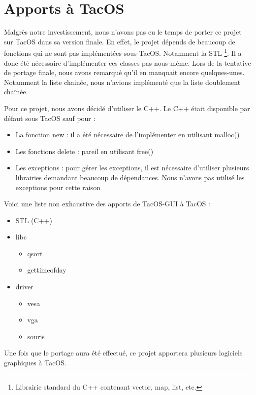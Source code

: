 \section{Apports à TacOS}

Malgrès notre investissement, nous n'avons pas eu le temps de porter ce projet sur TacOS dans sa version finale.
En effet, le projet dépends de beaucoup de fonctions qui ne sont pas implémentées sous TacOS.
Notamment la STL
\footnote{Librairie standard du C++ contenant vector, map, list, etc.}.
Il a donc été nécessaire d'implémenter ces classes pas nous-même.
Lors de la tentative de portage finale, nous avons remarqué qu'il en manquait encore quelques-unes.
Notamment la liste chainée, nous n'avions implémenté que la liste doublement chaînée.

Pour ce projet, nous avons décidé d'utiliser le C++.
Le C++ était disponible par défaut sous TacOS sauf pour :

\begin{itemize}
  \item La fonction new : il a été nécessaire de l'implémenter en utilisant malloc()
  \item Les fonctions delete : pareil en utilisant free()
  \item Les exceptions : pour gérer les exceptions, il est nécessaire d'utiliser plusieurs librairies demandant beaucoup de dépendances. Nous n'avons pas utilisé les exceptions pour cette raison
\end{itemize}

Voici une liste non exhaustive des apports de TacOS-GUI à TacOS :
  
\begin{itemize}
  \item STL (C++)
  \item libc
    \begin{itemize}
      \item qsort
      \item gettimeofday
    \end{itemize}
  \item driver
    \begin{itemize}
      \item vesa
      \item vga
      \item souris
    \end{itemize}
\end{itemize}

Une fois que le portage aura été effectué, ce projet apportera plusieurs logiciels graphiques à TacOS.
